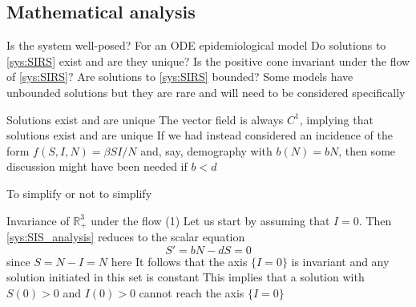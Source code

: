 \documentclass[aspectratio=43]{beamer}
\begin{document}
\subsection{Mathematical analysis}


\begin{frame}{Is the system well-posed?} 
For an ODE epidemiological model
\vfill
\bbullet Do solutions to \eqref{sys:SIRS} exist and are they unique?
\vfill
\bbullet Is the positive cone invariant under the flow of \eqref{sys:SIRS}?
\vfill
\bbullet Are solutions to \eqref{sys:SIRS} bounded?
Some models have unbounded solutions but they are rare and will need to be considered specifically
\end{frame}

\begin{frame}{Solutions exist and are unique}
\bbullet The vector field is always $C^1$, implying that solutions exist and are unique
\vfill
If we had instead considered an incidence of the form $f(S,I,N)=\beta SI/N$ and, say, demography with $b(N)=bN$, then some discussion might have been needed if $b<d$
\end{frame}


\begin{frame}{To simplify or not to simplify}

\end{frame}

\begin{frame}{Invariance of $\mathbb{R}_+^3$ under the flow (1)}
Let us start by assuming that $I=0$. Then \eqref{sys:SIS_analysis} reduces to the scalar equation
$$
S' = bN-dS=0
$$
since $S=N-I=N$ here
\vfill
It follows that the axis $\{I=0\}$ is invariant and any solution initiated in this set is constant
\vfill
This implies that a solution with $S(0)>0$ and $I(0)>0$ cannot reach the axis $\{I=0\}$  
\end{frame}
\end{document}
